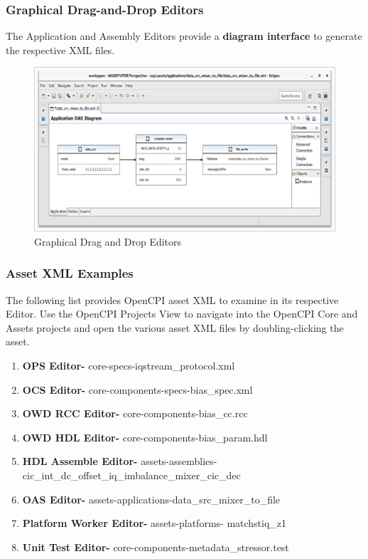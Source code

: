 \documentclass[10pt, a4paper, oneside]{article}
\begin{document}
\subsubsection{Graphical Drag-and-Drop Editors}
The Application and Assembly Editors provide a \textbf{diagram interface} to generate the respective XML files.
\begin{figure}[h!]
	\centering
	\caption{Graphical Drag and Drop Editors}\label{fig:GraphicalDragandDropEditors}
	\includegraphics[width=\textwidth]{GraphicalDragandDropEditors.png}
 \end{figure}

\subsubsection{Asset XML Examples}
The following list provides OpenCPI asset XML to examine in its respective Editor. Use the OpenCPI Projects View to navigate into the OpenCPI Core and Assets projects and open the various asset XML files by doubling-clicking the asset. \\
\begin{enumerate}
\item	\textbf{OPS Editor-} core-specs-iqstream\_protocol.xml
\item	\textbf{OCS Editor-} core-components-specs-bias\_spec.xml
\item	\textbf{OWD RCC Editor-} core-components-bias\_cc.rcc
\item	\textbf{OWD HDL Editor-} core-components-bias\_param.hdl
\item	\textbf{HDL Assemble Editor-} assets-assemblies-cic\_int\_dc\_offset\_iq\_imbalance\_mixer\_cic\_dec
\item	\textbf{OAS Editor-} assets-applications-data\_src\_mixer\_to\_file
\item	\textbf{Platform Worker Editor-} assets-platforms- matchstiq\_z1
\item	\textbf{Unit Test Editor-} core-components-metadata\_stressor.test
\end{enumerate}
\end{document}
